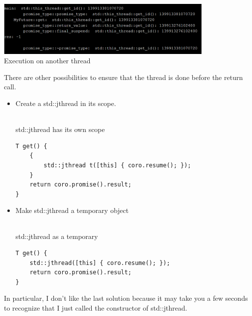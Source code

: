 \begin{center}
\includegraphics[width=0.8\textwidth]{content/3/chapter7/images/12.png}\\
Execution on another thread
\end{center}

There are other possibilities to ensure that the thread is done before the return call.

\begin{itemize}
\item 
Create a std::jthread in its scope.

\hspace*{\fill} \\ %
\noindent
std::jthread has its own scope
\begin{lstlisting}[style=styleCXX]
T get() {
	{
		std::jthread t([this] { coro.resume(); });
	}
	return coro.promise().result;
}
\end{lstlisting}

\item 
Make std::jthread a temporary object

\hspace*{\fill} \\ %
\noindent
std::jthread as a temporary
\begin{lstlisting}[style=styleCXX]
T get() {
	std::jthread([this] { coro.resume(); });
	return coro.promise().result;
}
\end{lstlisting}

\end{itemize}

In particular, I don’t like the last solution because it may take you a few seconds to recognize that I just called the constructor of std::jthread.
